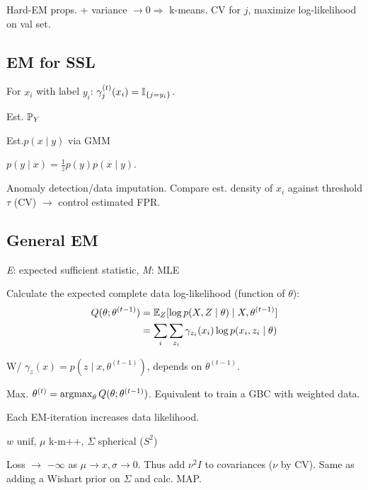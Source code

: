 Hard-EM props. + variance \(\to 0 \Rightarrow\) k-means.
CV for \(j\), maximize log-likelihood on val set.

\subsection{EM for SSL}
\begin{definition}[E-Step]
  For \(x_i\) with label \(y_i\): \(\gamma_j^{(t)}(x_i) = \I_{\{j = y_i\}}\).
\end{definition}
\begin{definition}[GM Bayes Cl.]
  \begin{enumerate*}
    \item Est. \(\P_Y\)
    \item Est.\(p(x \mid y)\) via GMM
    \item \(p(y \mid x) = \frac{1}{z}p(y)p(x \mid y)\).
  \end{enumerate*}
\end{definition}

\begin{definition}
  Anomaly detection/data imputation.  Compare est. density of \(x_i\) against threshold \(\tau\) (CV) \(\to\) control estimated FPR.
\end{definition}

\subsection{General EM}
\textit{E}: expected sufficient statistic, \textit{M}: MLE

\begin{definition}[E-Step]
  Calculate the expected complete data log-likelihood (function of \(\theta\)):
  \begin{align*}
    Q(\theta; \theta^{(t-1)}) &= \E_Z[\log p(X, Z \mid \theta) \mid X, \theta^{(t-1)}] \\
    &= \sum_i \sum_{z_i} \gamma_{z_i}(x_i) \log p(x_i, z_i \mid \theta)
  \end{align*}

  W/ \(\gamma_z(x) = p(z \mid x, \theta^{(t-1)})\), depends on \(\theta^{(t-1)}\).
\end{definition}

\begin{definition}[M-Step]
  Max. \(\theta^{(t)} = \argmax_\theta Q(\theta; \theta^{(t-1)})\). Equivalent to train a GBC with weighted data. 
\end{definition}

Each EM-iteration increases data likelihood.

\begin{definition}[EM-Init]
  \(w\) unif, \(\mu\) k-m++, \(\Sigma\) spherical (\(S^2\))
\end{definition}

\begin{definition}[Degeneracy]
  Loss \(\to\) \(-\infty\) as \(\mu \to x, \sigma \to 0\). Thus add \(\nu^2I\) to covariances (\(\nu\) by CV). Same as adding a Wishart prior on \(\Sigma\) and calc. MAP.
\end{definition}

